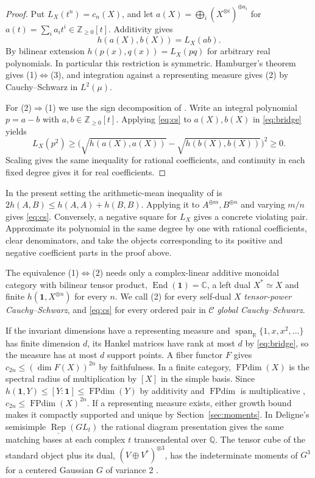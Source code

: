 \documentclass[11pt,reqno]{amsart}
\theoremstyle{definition}
\newcommand{\End}{\operatorname{End}}
\newcommand{\FPdim}{\operatorname{FPdim}}
\newcommand{\one}{\mathbf 1}
\newcommand{\C}{\mathcal C}
\newcommand{\RR}{\mathbb R}
\newcommand{\CC}{\mathbb C}
\newcommand{\ZZ}{\mathbb Z}
\newcommand{\Rep}{\operatorname{Rep}}
\begin{document}
\begin{proof}
Put $L_X(t^n)=c_n(X)$, and let
$a(X)=\bigoplus_i(X^{\otimes i})^{\oplus a_i}$ for
$a(t)=\sum_i a_it^i\in\ZZ_{\ge0}[t]$. Additivity gives
\begin{equation}\label{eq:bridge}
 h(a(X),b(X))=L_X(ab).
\end{equation}
By bilinear extension $h(p(x),q(x))=L_X(pq)$ for arbitrary real
polynomials. In particular this restriction is symmetric.
Hamburger's theorem gives (1)$\Leftrightarrow$(3), and integration
against a representing measure gives (2) by Cauchy--Schwarz in
$L^2(\mu)$.

For (2)$\Rightarrow$(1) we use the sign decomposition of
\cite[proof of Proposition~2.1]{FFK}. Write an integral polynomial
$p=a-b$ with $a,b\in\ZZ_{\ge0}[t]$. Applying \eqref{eq:cs}
to $a(X),b(X)$ in \eqref{eq:bridge} yields
\[
 L_X(p^2)\ge
 \bigl(\sqrt{h(a(X),a(X))}-\sqrt{h(b(X),b(X))}\bigr)^2\ge0.
\]
Scaling gives the same inequality for rational coefficients, and
continuity in each fixed degree gives it for real coefficients.
\end{proof}

In the present setting the arithmetic-mean inequality of \cite{FFK} is $2h(A,B)\le h(A,A)+h(B,B)$. Applying it to $A^{\oplus m},B^{\oplus n}$ and varying $m/n$ gives \eqref{eq:cs}. Conversely, a negative square for $L_X$ gives a concrete violating pair. Approximate its polynomial in the same degree by one with rational coefficients, clear denominators, and take the objects corresponding to its positive and negative coefficient parts in the proof above.

The equivalence (1)$\Leftrightarrow$(2) needs only a complex-linear additive monoidal category with bilinear tensor product, $\End(\one)=\CC$, a left dual $X^*\simeq X$ and finite $h(\one,X^{\otimes n})$ for every $n$. We call (2) for every self-dual $X$ \emph{tensor-power Cauchy--Schwarz}, and \eqref{eq:cs} for every ordered pair in $\C$ \emph{global Cauchy--Schwarz}.

If the invariant dimensions have a representing measure and $\operatorname{span}_{\RR}\{1,x,x^2,\ldots\}$ has finite dimension $d$, its Hankel matrices have rank at most $d$ by \eqref{eq:bridge}, so the measure has at most $d$ support points. A fiber functor $F$ gives $c_{2n}\le(\dim F(X))^{2n}$ by faithfulness. In a finite category, $\FPdim(X)$ is the spectral radius of multiplication by $[X]$ in the simple basis. Since $h(\one,Y)\le[Y:\one]\le\FPdim(Y)$ by additivity and $\FPdim$ is multiplicative \cite[\S4.5]{EGNO}, $c_{2n}\le\FPdim(X)^{2n}$. If a representing measure exists, either growth bound makes it compactly supported and unique by Section~\ref{sec:moments}. In Deligne's semisimple $\underline{\Rep}(GL_t)$ the rational diagram presentation gives the same matching bases at each complex $t$ transcendental over $\mathbb Q$. The tensor cube of the standard object plus its dual, $(V\oplus V^*)^{\otimes3}$, has the indeterminate moments of $G^3$ for a centered Gaussian $G$ of variance 2 \cite[Remark~3.8]{FFK}.
\end{document}
